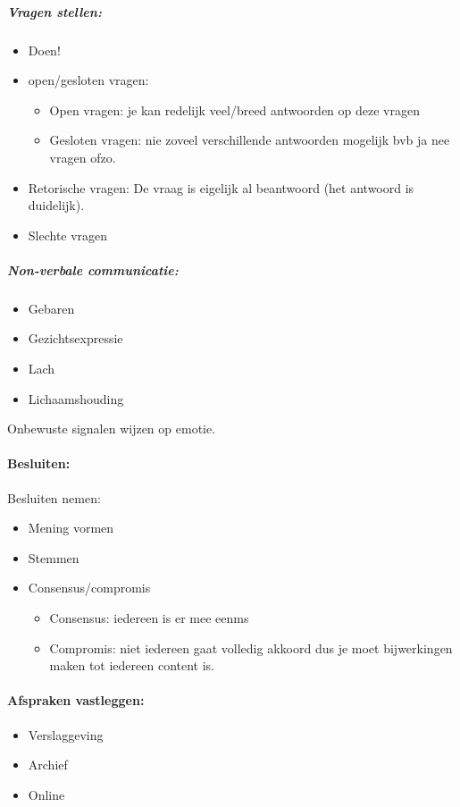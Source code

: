 \documentclass[12pt]{article}
\begin{document}
\subparagraph{Vragen stellen:}\begin{itemize}
    \item Doen!
    \item open/gesloten vragen:\begin{itemize}
        \item Open vragen: je kan redelijk veel/breed antwoorden op deze vragen
        \item Gesloten vragen: nie zoveel verschillende antwoorden mogelijk bvb ja nee vragen ofzo.
    \end{itemize}
    \item Retorische vragen: De vraag is eigelijk al beantwoord (het antwoord is duidelijk).
    \item Slechte vragen
\end{itemize}
\subparagraph{Non-verbale communicatie:}\begin{itemize}
    \item Gebaren 
    \item Gezichtsexpressie 
    \item Lach 
    \item Lichaamshouding
\end{itemize}
Onbewuste signalen wijzen op emotie.
\paragraph{Besluiten:}
Besluiten nemen:\begin{itemize}
    \item Mening vormen 
    \item Stemmen 
    \item Consensus/compromis\begin{itemize}
        \item Consensus: iedereen is er mee eenms 
        \item Compromis: niet iedereen gaat volledig akkoord dus je moet bijwerkingen maken tot iedereen content is.
    \end{itemize}
\end{itemize}
\paragraph{Afspraken vastleggen:}
\begin{itemize}
    \item Verslaggeving 
    \item Archief 
    \item Online
\end{itemize}
\end{document}
